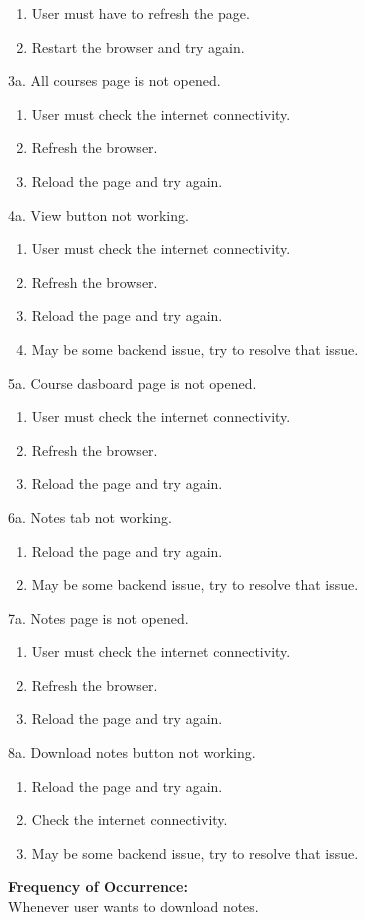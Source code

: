 \documentclass[12pt]{article}
\begin{document}
\begin{enumerate}
\item User must have to refresh the page.
\item Restart the browser and try again.
\end{enumerate} 
3a. All courses page is not opened.
\begin{enumerate}
\item User must check the internet connectivity.
\item Refresh the browser.
\item Reload the page and try again.
\end{enumerate}
4a. View button not working.
\begin{enumerate}
\item User must check the internet connectivity.
\item Refresh the browser.
\item Reload the page and try again.
\item May be some backend issue, try to resolve that issue.
\end{enumerate}
5a. Course dasboard page is not opened.
\begin{enumerate}
\item User must check the internet connectivity.
\item Refresh the browser.
\item Reload the page and try again.
\end{enumerate}
6a. Notes tab not working.
\begin{enumerate}
\item Reload the page and try again.
\item May be some backend issue, try to resolve that issue.
\end{enumerate}
7a. Notes page is not opened.
\begin{enumerate}
\item User must check the internet connectivity.
\item Refresh the browser.
\item Reload the page and try again.
\end{enumerate}
8a. Download notes button not working.
\begin{enumerate}
\item Reload the page and try again.
\item Check the internet connectivity.
\item May be some backend issue, try to resolve that issue.
\end{enumerate}
\textbf{Frequency of Occurrence:}\\
Whenever user wants to download notes.
\end{document}
